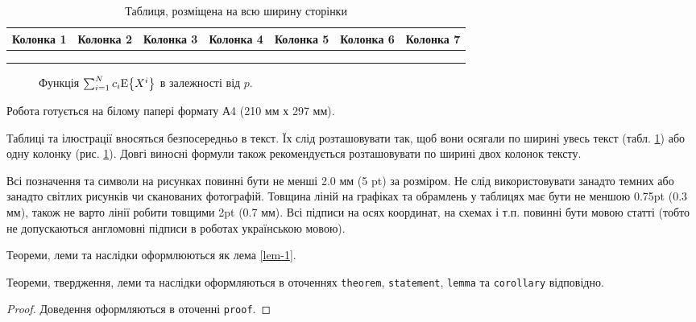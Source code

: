 \documentclass{KnuBulletin}
\begin{document}
\begin{table}[H]
\centering %
\caption{Таблиця, розміщена на всю ширину сторінки} %
\label{tab-1} %
\begin{tabular}{|c|c|c|c|c|c|c|}
\hline
Колонка 1& Колонка 2& Колонка 3& Колонка 4& Колонка 5& Колонка 6 & Колонка 7\\
\hline
&&&&&&\\
\hline
&&&&&&\\
\hline
&&&&&&\\
\hline
\end{tabular}
\end{table}

\begin{multicols}{2}
		 \begin{figure}[H]
		     \hfil
		     
		     \hfil
		     \caption{Функція $\sum_{i=1}^{N} c_i {{\rm E}{\left\{X^i\right\}}}$ в залежності від $p$.}
		     \label{fig-1}
		 \end{figure}	
    
	Робота готується на білому папері формату А4 (210 мм х 297 мм). 
	
	Таблиці та ілюстрації вносяться безпосередньо в текст. 
	Їх слід розташовувати так, щоб вони осягали по ширині увесь текст (табл. \ref{tab-1}) 
	або одну колонку (рис. \ref{fig-1}). 
	Довгі виносні формули також рекомендується розташовувати по ширині двох колонок тексту. 

	Всі позначення та символи на рисунках повинні бути не менші 2.0 мм (5 pt) за розміром. Не слід використовувати занадто темних або занадто світлих рисунків чи сканованих фотографій. Товщина ліній на графіках та обрамлень у таблицях має бути не меншою 0.75pt (0.3 мм), також не варто лінії робити товщими 2pt (0.7 мм). Всі підписи на осях координат, на схемах і т.п. повинні бути мовою статті (тобто не допускаються англомовні підписи в роботах українською мовою). 
	
	Теореми, леми та наслідки оформлюються як лема \ref{lem-1}.
    \begin{lemma}
    	\label{lem-1}
	    Теореми, твердження, леми та наслідки оформляються в оточеннях 
	    \texttt{theorem}, \texttt{statement}, \texttt{lemma} та \texttt{corollary} відповідно.
    \end{lemma}
    \begin{proof}
    	Доведення оформляються в оточенні \texttt{proof}.
    \end{proof}


\end{multicols}
\end{document}
